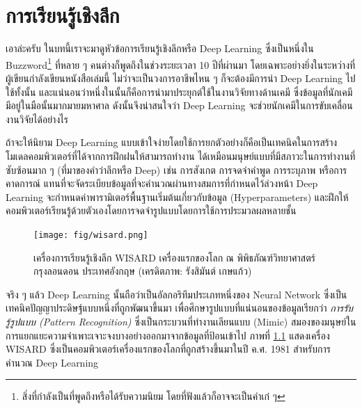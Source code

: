 

\chapter{การเรียนรู้เชิงลึก}
\label{ch:dl}

เอาล่ะครับ ในบทนี้เราจะมาดูหัวข้อการเรียนรู้เชิงลึกหรือ Deep Learning ซึ่งเป็นหนึ่งใน Buzzword\footnote{สิ่งที่กำลังเป็นที่พูดถึงหรือได้รับความนิยม
โดยที่ฟังแล้วก็อาจจะเป็นคำเก๋ ๆ} ที่หลาย ๆ คนต่างก็พูดถึงในช่วงระยะเวลา 10 ปีที่ผ่านมา โดยเฉพาะอย่างยิ่งในระหว่างที่ผู้เขียนกำลังเขียนหนังสือเล่มนี้ 
ไม่ว่าจะเป็นวงการอาชีพไหน ๆ ก็จะต้องมีการนำ Deep Learning ไปใช้ทั้งนั้น และแน่นอนว่าหนึ่งในนั้นก็คือการนำมาประยุกต์ใช้ในงานวิจัยทางด้านเคมี 
ซึ่งข้อมูลที่นักเคมีมีอยู่ในมือนั้นมากมายมหาศาล ดังนั้นจึงน่าสนใจว่า Deep Learning จะช่วยนักเคมีในการขับเคลื่อนงานวิจัยได้อย่างไร

ถ้าจะให้นิยาม Deep Learning แบบเข้าใจง่ายโดยใช้การยกตัวอย่างก็คือเป็นเทคนิคในการสร้างโมเดลคอมพิวเตอร์ที่ได้จากการฝึกฝนให้สามารถทำงาน%
ได้เหมือนมนุษย์แบบที่มีสภาวะในการทำงานที่ซับซ้อนมาก ๆ (ที่มาของคำว่าลึกหรือ Deep) เช่น การสังเกต การจดจำคำพูด การระบุภาพ หรือการคาดการณ์ 
แทนที่จะจัดระเบียบข้อมูลที่จะคำนวณผ่านทางสมการที่กำหนดไว้ล่วงหน้า Deep Learning จะกำหนดค่าพารามิเตอร์พื้นฐานเริ่มต้นเกี่ยวกับข้อมูล 
(Hyperparameters) และฝึกให้คอมพิวเตอร์เรียนรู้ด้วยตัวเองโดยการจดจำรูปแบบโดยการใช้การประมวลผลหลายชั้น

\begin{figure}[H]
    \centering
    \texttt{[image: fig/wisard.png]}
    \caption{เครื่องการเรียนรู้เชิงลึก WISARD เครื่องแรกของโลก ณ พิพิธภัณฑ์วิทยาศาสตร์ กรุงลอนดอน ประเทศอังกฤษ 
    (เครดิตภาพ: รังสิมันต์ เกษแก้ว)}
    \label{fig:wisard}
\end{figure}

จริง ๆ แล้ว Deep Learning นั้นถือว่าเป็นอัลกอริทึมประเภทหนึ่งของ Neural Network ซึ่งเป็นเทคนิคปัญญาประดิษฐ์แบบหนึ่งที่ถูกพัฒนาขึ้นมา%
เพื่อศึกษารูปแบบที่แน่นอนของข้อมูลเรียกว่า \textit{การรับรู้รูปแบบ (Pattern Recognition)} ซึ่งเป็นกระบวนที่ทำงานเลียนแบบ (Mimic) 
สมองของมนุษย์ในการแยกแยะความจำเพาะเจาะจงบางอย่างออกมาจากข้อมูลที่ป้อนเข้าไป ภาพที่ \ref{fig:wisard} แสดงเครื่อง WISARD 
ซึ่งเป็นคอมพิวเตอร์เครื่องแรกของโลกที่ถูกสร้างขึ้นมาในปี ค.ศ. 1981 สำหรับการคำนวณ Deep Learning

